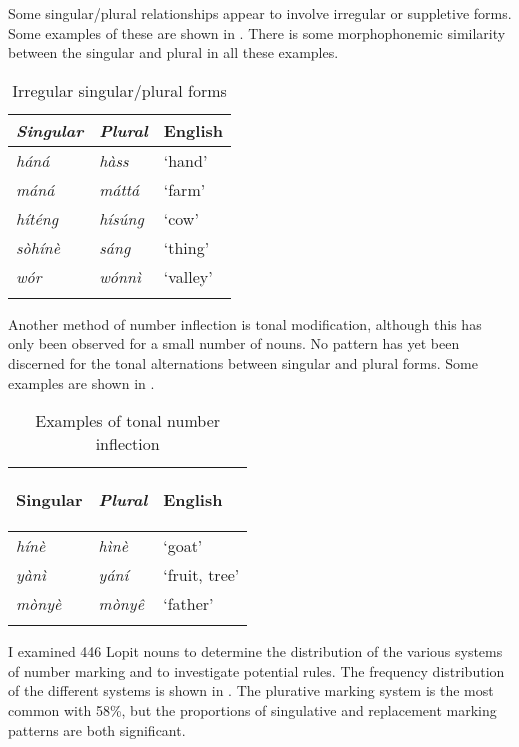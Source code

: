 \documentclass[output=paper]{langsci/langscibook}
\begin{document}
Some singular/plural relationships appear to involve irregular or suppletive forms. Some examples of these are shown in . There is some morphophonemic similarity between the singular and plural in all these examples. 

\begin{table}
\begin{tabularx}{\textwidth}{>{\itshape}X>{\itshape}XX}
\lsptoprule
  \textup{Singular} &  \textup{Plural} &  English\\ \midrule
 háná &  hàss & ‘hand’\\
 máná &  máttá & ‘farm’\\
 híténg &  hísúng & ‘cow’\\
 sòhínè &  sáng & ‘thing’\\
 wór &  wónnì & ‘valley’\\
\lspbottomrule
\end{tabularx}
\caption{Irregular singular/plural forms}
\label{tab:moodie:3}
\end{table}

Another method of number inflection is tonal modification, although this has only been observed for a small number of nouns. No pattern has yet been discerned for the tonal alternations between singular and plural forms. Some examples are shown in .

\begin{table}
\begin{tabularx}{\textwidth}{>{\itshape}X>{\itshape}XX}
\lsptoprule

  \textup{Singular} &   \textup{Plural} &   {English}\\
\midrule
 hínè &  hìnè &  ‘goat’\\
 yànì &  yání &  ‘fruit, tree’\\
 mònyè &  mòny\^{e} &  ‘father’\\
\lspbottomrule
\end{tabularx}
\caption{Examples of tonal number inflection}
\label{tab:moodie:4}
\end{table}

I examined 446 Lopit nouns to determine the distribution of the various systems of number marking and to investigate potential rules. The frequency distribution of the different systems is shown in . The plurative marking system is the most common with 58\%, but the proportions of singulative and replacement marking patterns are both significant. 
\end{document}
